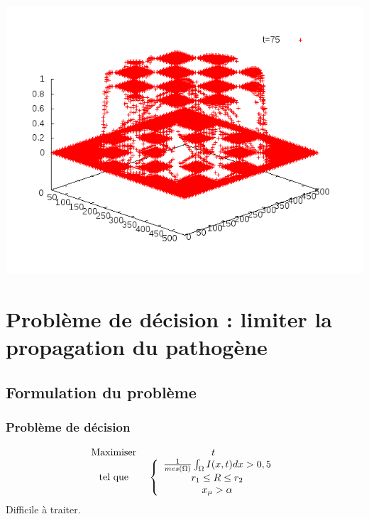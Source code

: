 \documentclass[handout]{beamer}
\begin{document}
\begin{frame}
	\includegraphics[scale=0.2]{img/anim2-80-150.png}
\end{frame}

\section[Limite propagation]{Problème de décision : limiter la propagation du pathogène}
\subsection[Problème]{Formulation du problème}
\begin{frame}
	\frametitle{Problème de décision}
\[\begin{array}{c c}
	\text{Maximiser } &t\\
	\text{tel que } & \left\{\begin{array}{c}
			\frac{1}{mes(\Omega)}\int_\Omega I(x,t) dx > 0,5\\
			r_1\leq R\leq r_2\\
			x_{\mu}>\alpha
			\end{array}\right.
\end{array}\]
Difficile à traiter.
\end{frame}
\end{document}
